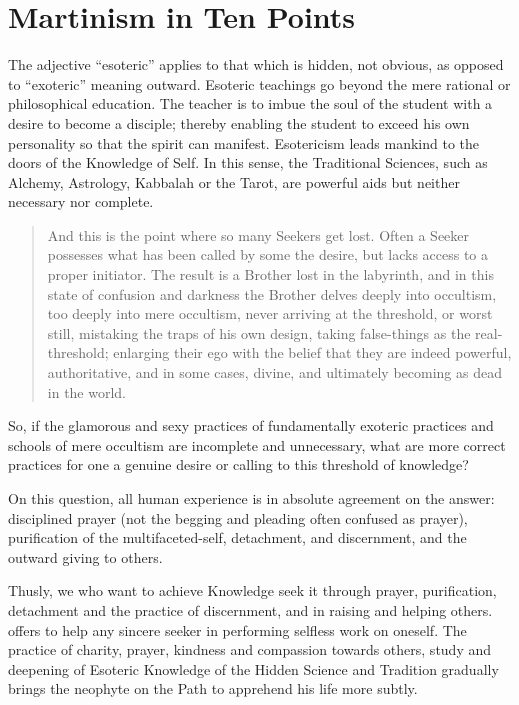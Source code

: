 \section{Martinism in Ten Points}


The adjective ``esoteric'' applies to that which is hidden, not obvious, as opposed to
``exoteric'' meaning outward. Esoteric teachings go beyond the mere rational or
philosophical education. The teacher is to imbue the soul of the student with a desire to
become a disciple; thereby enabling the student to exceed his own personality so that the
spirit can manifest. Esotericism leads mankind to the doors of the Knowledge of Self. In
this sense, the Traditional Sciences, such as Alchemy, Astrology, Kabbalah or the Tarot, are powerful aids but neither necessary nor complete.

\begin{quote}
And this is the point where so many Seekers get lost. Often a Seeker possesses what has
been called by some the desire, but lacks access to a proper initiator. The result is a Brother lost in the labyrinth, and in this state of confusion and darkness the Brother delves deeply
into occultism, too deeply into mere occultism, never arriving at the threshold, or worst
still, mistaking the traps of his own design, taking false-things as the real-threshold;
enlarging their ego with the belief that they are indeed powerful, authoritative, and in some
cases, divine, and ultimately becoming as dead in the world.
\end{quote}

So, if the glamorous and sexy practices of fundamentally exoteric practices and schools of
mere occultism are incomplete and unnecessary, what are more correct practices for one a
genuine desire or calling to this threshold of knowledge?

On this question, all human experience is in absolute agreement on the answer: disciplined
prayer (not the begging and pleading often confused as prayer), purification of the
multifaceted-self, detachment, and discernment, and the outward giving to others.

Thusly, we who want to achieve Knowledge seek it through prayer, purification,
detachment and the practice of discernment, and in raising and helping others. \moup{} offers to help any sincere seeker in performing 
selfless work on oneself. The practice of charity, prayer, kindness and compassion towards
others, study and deepening of Esoteric Knowledge of the Hidden Science and Tradition
gradually brings the neophyte on the Path to apprehend his life more subtly.

